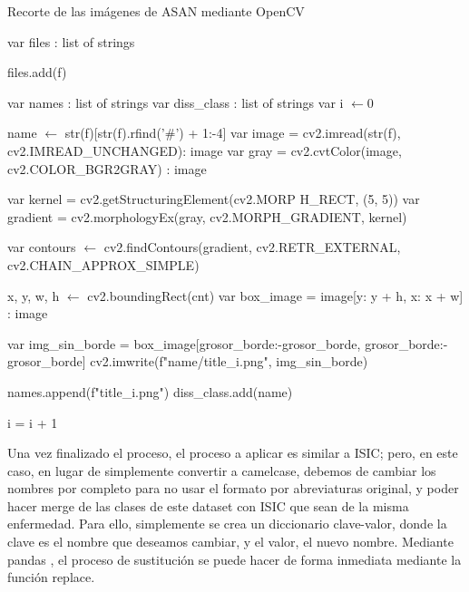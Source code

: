 \begin{algorithm}[H]
		\label{cortarasan}
		\caption{Recorte de las imágenes de ASAN mediante OpenCV}
		\begin{algorithmic}
			\State var files : list of strings
			
			 	 \If {f is\_file()]}
			 	 	\State files.add(f)
			 	 \EndIf
			 \EndFor
			 	 
			\State var names : list of strings
			\State var  diss\_class : list of strings
			 \State var i $\gets 0$
			
				   \State name $\gets$ str(f)[str(f).rfind('\#') + 1:-4]
						\State var image = cv2.imread(str(f), cv2.IMREAD\_UNCHANGED): image
						\State var gray = cv2.cvtColor(image, cv2.COLOR\_BGR2GRAY) : image
			
						\State var kernel = cv2.getStructuringElement(cv2.MORP H\_RECT, (5, 5))
						\State var gradient = cv2.morphologyEx(gray, cv2.MORPH\_GRADIENT, kernel)
			
						\State var contours $\gets$ cv2.findContours(gradient, cv2.RETR\_EXTERNAL, cv2.CHAIN\_APPROX\_SIMPLE)
			
								\State	x, y, w, h  $\gets$ cv2.boundingRect(cnt)
								\State var box\_image = image[y: y + h, x: x + w] : image
				
								\State var img\_sin\_borde = box\_image[grosor\_borde:-grosor\_borde, grosor\_borde:-grosor\_borde]
								\State cv2.imwrite(f"{name}/{title}\_{i}.png", img\_sin\_borde)
					
								\State names.append(f"{title}\_{i}.png")
								\State diss\_class.add(name)
								
								\State i = i + 1
						 \EndFor
				\EndIf	 
	\EndFor
				
\EndProcedure
\end{algorithmic}
\end{algorithm}

Una vez finalizado el proceso, el proceso a aplicar es similar a ISIC; pero, en este caso, en lugar de simplemente convertir a camelcase, debemos de cambiar los nombres por completo para no usar el formato por abreviaturas original, y poder hacer merge de las clases de este dataset con ISIC que sean de la misma enfermedad. Para ello, simplemente se crea un diccionario clave-valor, donde la clave es el nombre que deseamos cambiar, y el valor, el nuevo nombre. Mediante pandas \cite{reback2020pandas}, el proceso de sustitución se puede hacer de forma inmediata mediante la función replace.

